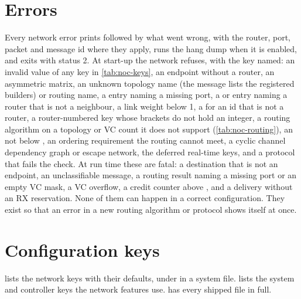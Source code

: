 \section{Errors}\label{sec:noc-errors}

Every network error prints  followed by what went wrong, with the router, port,
packet and message id where they apply, runs the hang dump when it is enabled, and exits with
status 2. At start-up the network refuses, with the key named: an invalid value of any key in
\cref{tab:noc-keys}, an endpoint without a router, an asymmetric  matrix, an unknown
topology name (the message lists the registered builders) or routing name, a 
entry naming a missing port, a  or  entry naming a router
that is not a neighbour, a link weight below 1, a  for an id that is
not a router, a router-numbered key whose brackets do not hold an integer, a routing algorithm on a topology or VC count it does not support
(\cref{tab:noc-routing}), an  not below , an ordering
requirement the routing cannot meet, a cyclic channel dependency graph or escape network, the
deferred real-time keys, and a protocol that fails the check. At run time these are fatal: a destination that is not an endpoint,
an unclassifiable message, a routing result naming a missing port or an empty VC mask, a VC
overflow, a credit counter above , and a delivery without an RX reservation. None of
them can happen in a correct configuration. They exist so that an error in a new routing algorithm
or protocol shows itself at once.

\section{Configuration keys}\label{sec:noc-keys}

 lists the network keys with their defaults, under  in a
system file.  lists the system and controller keys the network features use.
 has every shipped file in full.

